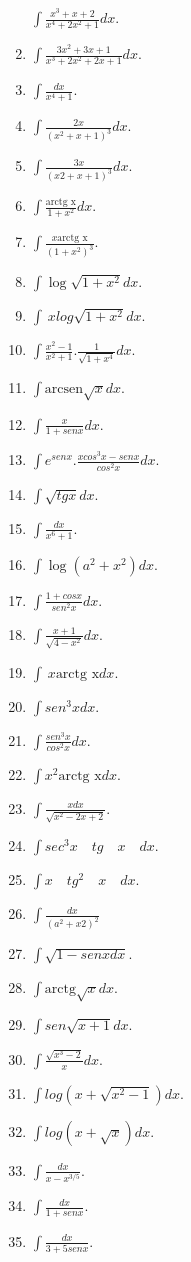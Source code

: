 \documentclass[12pt,]{article}
\begin{document}
\begin{enumerate}
  \(\displaystyle\int\frac{x^3+x+2}{x^4+2x^2+1}dx.\)
\item
  \(\displaystyle\int\frac{3x^2+3x+1}{x^3+2x^2+2x+1}dx.\)
\item
  \(\displaystyle\int\frac{dx}{x^4+1}.\)
\item
  \(\displaystyle\int\frac{2x}{(x^2+x+1)^3}dx.\)
\item
  \(\displaystyle\int\frac{3x}{(x2+x+1)^3}dx.\)
\item
  \(\displaystyle\int\frac{\text{arctg x}}{1+x^2}dx.\)
\item
  \(\displaystyle\int\frac{x\text{arctg x}}{(1+x^2)^3}.\)
\item
  \(\displaystyle\int\log \sqrt{1+x^2}dx.\)
\item
  \(\displaystyle\int\ x log\sqrt{1+x^2}dx.\)
\item
  \(\displaystyle\int\frac{x^2-1}{x^2+1}.\frac{1}{\sqrt{1+x^4}}dx.\)
\item
  \(\displaystyle\int\text{arcsen}\sqrt{x}dx.\)
\item
  \(\displaystyle\int\frac{x}{1+senx}dx.\)
\item
  \(\displaystyle\int e^{senx}.\frac{xcos^3x-senx}{cos^2x}dx.\)
\item
  \(\displaystyle\int\sqrt{tgx}dx.\)
\item
  \(\displaystyle\int\frac{dx}{x^6+1}.\)
\item
  \(\displaystyle\int\log(a^2+x^2)dx.\)
\item
  \(\displaystyle\int\frac{1+cosx}{sen^2x}dx.\)
\item
  \(\displaystyle\int\frac{x+1}{\sqrt{4-x^2}}dx.\)
\item
  \(\displaystyle\int\ x\text{arctg x}dx.\)
\item
  \(\displaystyle\int sen^3 x dx.\)
\item
  \(\displaystyle\int\frac{sen^3 x}{cos^2 x}dx.\)
\item
  \(\displaystyle\int x^2\text{arctg x}dx.\)
\item
  \(\displaystyle\int\frac{x dx}{\sqrt{x^2-2x+2}}.\)
\item
  \(\displaystyle\int sec^3x\quad tg\quad x\quad dx.\)
\item
  \(\displaystyle\int x\quad tg^2\quad x\quad dx.\)
\item
  \(\displaystyle\int\frac{dx}{(a^2+x {2})^2}\)
\item
  \(\displaystyle\int\sqrt{1-senx dx}.\)
\item
  \(\displaystyle\int\text{arctg}\sqrt{x}dx.\)
\item
  \(\displaystyle\int sen\sqrt{x+1}dx.\)
\item
  \(\displaystyle\int\frac{\sqrt{x^3-2}}{x}dx.\)
\item
  \(\displaystyle\int log(x+\sqrt{x^2-1})dx.\)
\item
  \(\displaystyle\int log(x+\sqrt{x})dx.\)
\item
  \(\displaystyle\int\frac{dx}{x-x^{3/5}}.\)
\item
  \(\displaystyle\int\frac{dx}{1+sen x}.\)
\item
  \(\displaystyle\int\frac{dx}{3+5senx}.\)
\end{enumerate}
\end{document}
